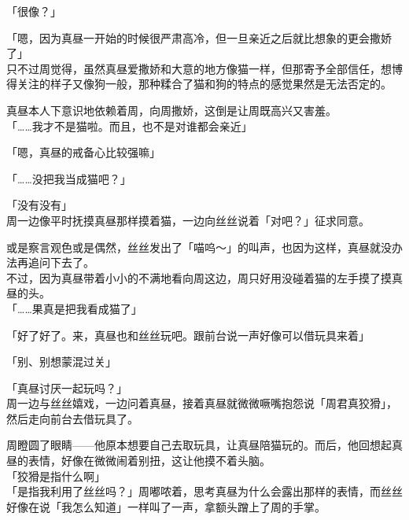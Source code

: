 「很像？」

「嗯，因为真昼一开始的时候很严肃高冷，但一旦亲近之后就比想象的更会撒娇了」\\

只不过周觉得，虽然真昼爱撒娇和大意的地方像猫一样，但那寄予全部信任，想博得关注的样子又像狗一般，那种糅合了猫和狗的特点的感觉果然是无法否定的。

真昼本人下意识地依赖着周，向周撒娇，这倒是让周既高兴又害羞。\\

「……我才不是猫啦。而且，也不是对谁都会亲近」

「嗯，真昼的戒备心比较强嘛」

「……没把我当成猫吧？」

「没有没有」\\

周一边像平时抚摸真昼那样摸着猫，一边向丝丝说着「对吧？」征求同意。

或是察言观色或是偶然，丝丝发出了「喵呜～」的叫声，也因为这样，真昼就没办法再追问下去了。\\

不过，因为真昼带着小小的不满地看向周这边，周只好用没碰着猫的左手摸了摸真昼的头。\\

「……果真是把我看成猫了」

「好了好了。来，真昼也和丝丝玩吧。跟前台说一声好像可以借玩具来着」

「别、别想蒙混过关」

「真昼讨厌一起玩吗？」\\

周一边与丝丝嬉戏，一边问着真昼，接着真昼就微微噘嘴抱怨说「周君真狡猾」，然后走向前台去借玩具了。

周瞪圆了眼睛——他原本想要自己去取玩具，让真昼陪猫玩的。而后，他回想起真昼的表情，好像在微微闹着别扭，这让他摸不着头脑。\\

「狡猾是指什么啊」\\

「是指我利用了丝丝吗？」周嘟哝着，思考真昼为什么会露出那样的表情，而丝丝好像在说「我怎么知道」一样叫了一声，拿额头蹭上了周的手掌。
